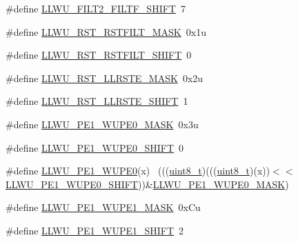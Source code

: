 \begin{DoxyCompactItemize}
\item 
\#define \hyperlink{group___l_l_w_u___register___masks_ga20b3ccaef11cade3a0dc88b3a378b790}{L\+L\+W\+U\+\_\+\+F\+I\+L\+T2\+\_\+\+F\+I\+L\+T\+F\+\_\+\+S\+H\+I\+FT}~7
\item 
\#define \hyperlink{group___l_l_w_u___register___masks_ga6a909bf1d49bb4f85ad988396fe928f2}{L\+L\+W\+U\+\_\+\+R\+S\+T\+\_\+\+R\+S\+T\+F\+I\+L\+T\+\_\+\+M\+A\+SK}~0x1u
\item 
\#define \hyperlink{group___l_l_w_u___register___masks_gaaa76fead204f735855760c2f071ac11f}{L\+L\+W\+U\+\_\+\+R\+S\+T\+\_\+\+R\+S\+T\+F\+I\+L\+T\+\_\+\+S\+H\+I\+FT}~0
\item 
\#define \hyperlink{group___l_l_w_u___register___masks_ga9c57c7139b6659782c0a5e160b790c3e}{L\+L\+W\+U\+\_\+\+R\+S\+T\+\_\+\+L\+L\+R\+S\+T\+E\+\_\+\+M\+A\+SK}~0x2u
\item 
\#define \hyperlink{group___l_l_w_u___register___masks_gaf1c8b75e71d3086612da4e1e2f768d72}{L\+L\+W\+U\+\_\+\+R\+S\+T\+\_\+\+L\+L\+R\+S\+T\+E\+\_\+\+S\+H\+I\+FT}~1
\item 
\#define \hyperlink{group___l_l_w_u___register___masks_ga6ed6c56a8797caa64d27eb915c164dad}{L\+L\+W\+U\+\_\+\+P\+E1\+\_\+\+W\+U\+P\+E0\+\_\+\+M\+A\+SK}~0x3u
\item 
\#define \hyperlink{group___l_l_w_u___register___masks_ga234c02ee9c2b3e3e248c90473e922336}{L\+L\+W\+U\+\_\+\+P\+E1\+\_\+\+W\+U\+P\+E0\+\_\+\+S\+H\+I\+FT}~0
\item 
\#define \hyperlink{group___l_l_w_u___register___masks_gad0111a325ce3f549a1726373cde88f96}{L\+L\+W\+U\+\_\+\+P\+E1\+\_\+\+W\+U\+P\+E0}(x)                                            ~(((\hyperlink{_p_e___types_8h_aba7bc1797add20fe3efdf37ced1182c5}{uint8\+\_\+t})(((\hyperlink{_p_e___types_8h_aba7bc1797add20fe3efdf37ced1182c5}{uint8\+\_\+t})(x))$<$$<$\hyperlink{group___l_l_w_u___register___masks_ga234c02ee9c2b3e3e248c90473e922336}{L\+L\+W\+U\+\_\+\+P\+E1\+\_\+\+W\+U\+P\+E0\+\_\+\+S\+H\+I\+FT}))\&\hyperlink{group___l_l_w_u___register___masks_ga6ed6c56a8797caa64d27eb915c164dad}{L\+L\+W\+U\+\_\+\+P\+E1\+\_\+\+W\+U\+P\+E0\+\_\+\+M\+A\+SK})
\item 
\#define \hyperlink{group___l_l_w_u___register___masks_gac0c417f78992f2ebaca7267ef06d888a}{L\+L\+W\+U\+\_\+\+P\+E1\+\_\+\+W\+U\+P\+E1\+\_\+\+M\+A\+SK}~0x\+Cu
\item 
\#define \hyperlink{group___l_l_w_u___register___masks_gaa9b8224f389f9c3d4f13772d8e5fbeee}{L\+L\+W\+U\+\_\+\+P\+E1\+\_\+\+W\+U\+P\+E1\+\_\+\+S\+H\+I\+FT}~2
\item 
$$
\end{DoxyCompactItemize}
